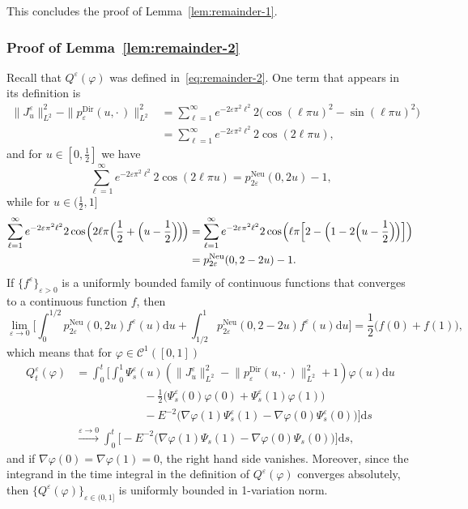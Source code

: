 \documentclass[10pt]{amsart}
\theoremstyle{definition}\newtheorem{defi}[theo]{Definition}\newtheorem{rema}[theo]{Remark}\newtheorem{exam}[theo]{Example}\newtheorem{exem}[theo]{Example}\newtheorem{nota}[theo]{Notation}
\DeclareMathOperator{\Dir}{Dir}
\DeclareMathOperator{\Neu}{Neu}
\newcommand{\mc}[1]{{\mathcal #1}}
\renewcommand{\mc}[1]{{\mathcal #1}}
\newcommand*{\dd}{\mathrm{d}}
\newcommand*{\ds}{\dd s}
\newcommand*{\du}{\dd u}
\newcommand*{\Mk}{\mkern -2mu}
\renewcommand{\tfrac}{\frac}
\begin{document}
This concludes the proof of Lemma~\ref{lem:remainder-1}.

\subsubsection{Proof of Lemma~\ref{lem:remainder-2}}

Recall that $Q^{\varepsilon} (\varphi)$ was defined in~\eqref{eq:remainder-2}. One term that appears in its definition is
\begin{align*}
\| J^{\varepsilon}_u \|_{L^2}^2 - \| p^{\Dir}_{\varepsilon} (u, \cdot\,)
\|_{L^2}^2 & = \sum_{\ell = 1}^{\infty} e^{- 2\varepsilon \pi^2 \ell^2} 2
\big(\cos (\ell \pi u)^2 - \sin (\ell \pi u)^2\big) \\
& = \sum_{\ell = 1}^{\infty} e^{-2
\varepsilon \pi^2 \ell^2} 2 \cos (2 \ell \pi u),
\end{align*}
and for $u \in [0, \frac12]$ we have
\[
\sum_{\ell = 1}^{\infty} e^{- 2\varepsilon \pi^2 \ell^2} 2 \cos (2 \ell \pi u) = p^{\Neu}_{2\varepsilon} (0, 2 u) - 1,
\]
while for $u \in (\frac12, 1]$
\begin{align*}
\sum_{\ell = 1}^{\infty} e^{- 2\varepsilon \pi^2 \ell^2} 2 \cos \Mk\Big(2 \ell \pi
\Big(\tfrac12 + \Big(u - \tfrac12\Big)\Mk\Big)\Mk\Big) & = \sum_{\ell = 1}^{\infty} e^{-2 \varepsilon \pi^2
\ell^2} 2 \cos \Mk\Big(\ell \pi \Big[2 - \Big(1 - 2 \Big(u - \tfrac12\Big)\Mk\Big)\Big]\Big)\\
& = p^{\Neu}_{2\varepsilon} (0, 2 - 2 u) - 1.
\end{align*}
If $\{f^{\varepsilon}\}_{\varepsilon>0}$ is a uniformly bounded family of continuous functions that converges to a continuous function $f$, then
\[
\lim_{\varepsilon \rightarrow 0} \bigg[\int_0^{1/2} p^{\Neu}_{2\varepsilon} (0, 2 u) f^{\varepsilon} (u) \du + \int_{1/2}^1 p^{\Neu}_{2\varepsilon} (0, 2 - 2 u) f^{\varepsilon} (u) \du \bigg] =
\frac{1}{2} \big(f (0) + f (1)\big),
\]
which means that for $\varphi \in \mc C^1([0,1])$
\begin{align*}
Q^{\varepsilon}_t (\varphi) & = \int_0^t
\bigg[\int_0^1 \Psi^{\varepsilon}_s (u) \left(\big\| J^{\varepsilon}_u
\big\|_{L^2}^2 - \big\| p^{\Dir}_{\varepsilon} (u, \cdot\,) \big\|_{L^2}^2 + 1\right) \varphi (u) \du \\ & \qquad \qquad \qquad - \frac{1}{2} \big(\Psi^\varepsilon_s (0) \varphi (0) + \Psi^\varepsilon_s (1) \varphi (1)\big) \\
& \qquad \qquad \qquad - E^{- 2} \big(\nabla \varphi (1) \Psi^{\varepsilon}_s (1) -
\nabla \varphi (0) \Psi^{\varepsilon}_s (0)\big) \bigg] \ds\\
& \xrightarrow{\varepsilon \to 0} \int_0^t \Big[- E^{- 2} \big(\nabla \varphi (1) \Psi_s (1) - \nabla \varphi (0) \Psi_s (0)\big)\Big] \ds,
\end{align*}
and if $\nabla \varphi(0) = \nabla \varphi(1) = 0$, the right hand side vanishes. Moreover, since the integrand in the time integral in the definition of $Q^\varepsilon(\varphi)$ converges absolutely, then $\{Q^\varepsilon(\varphi)\}_{\varepsilon \in (0,1]}$ is uniformly bounded in 1-variation norm.
\end{document}
